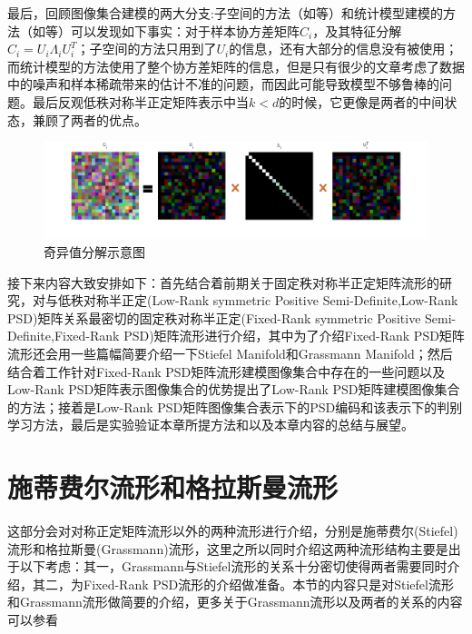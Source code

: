 最后，回顾图像集合建模的两大分支:子空间的方法（如\cite{Subspace_GDA,Subspace_MSM}等）和统计模型建模的方法（如\cite{Statistics_CDL,Statistics_Vemu,Statistics_SPDML,Statistics_LMKML,Statistics_HERML,Statistics_DARG}等）可以发现如下事实：对于样本协方差矩阵$C_{i}$，及其特征分解$C_{i}=U_{i}\Lambda_{i} U^{T}_{i}$；子空间的方法只用到了$U_{i}$的信息，还有大部分的信息没有被使用；而统计模型的方法使用了整个协方差矩阵的信息，但是只有很少的文章考虑了数据中的噪声和样本稀疏带来的估计不准的问题，而因此可能导致模型不够鲁棒的问题。最后反观低秩对称半正定矩阵表示中当$k<d$的时候，它更像是两者的中间状态，兼顾了两者的优点。
\begin{figure}[hbt]
	\centering
	\includegraphics[width=0.95\linewidth]{source/svd_decomposition.png}
	\caption{奇异值分解示意图}
	\label{fig:SVD_Decomposition}
\end{figure}

接下来内容大致安排如下：首先结合着前期关于固定秩对称半正定矩阵流形的研究，对与低秩对称半正定(Low-Rank symmetric Positive Semi-Definite,Low-Rank PSD)矩阵关系最密切的固定秩对称半正定(Fixed-Rank symmetric Positive Semi-Definite,Fixed-Rank PSD)矩阵流形进行介绍，其中为了介绍Fixed-Rank PSD矩阵流形还会用一些篇幅简要介绍一下Stiefel Manifold和Grassmann Manifold；然后结合着工作\cite{PSD_WACV}针对Fixed-Rank PSD矩阵流形建模图像集合中存在的一些问题以及Low-Rank PSD矩阵表示图像集合的优势提出了Low-Rank PSD矩阵建模图像集合的方法；接着是Low-Rank PSD矩阵图像集合表示下的PSD编码和该表示下的判别学习方法，最后是实验验证本章所提方法和以及本章内容的总结与展望。

\section{施蒂费尔流形和格拉斯曼流形}
\label{sec:Grassmann_Manifold}
这部分会对对称正定矩阵流形以外的两种流形进行介绍，分别是施蒂费尔(Stiefel)流形和格拉斯曼(Grassmann)流形，这里之所以同时介绍这两种流形结构主要是出于以下考虑：其一，Grassmann与Stiefel流形的关系十分密切使得两者需要同时介绍，其二，为Fixed-Rank PSD流形的介绍做准备。本节的内容只是对Stiefel流形和Grassmann流形做简要的介绍，更多关于Grassmann流形以及两者的关系的内容可以参看\cite{Grassmann}

